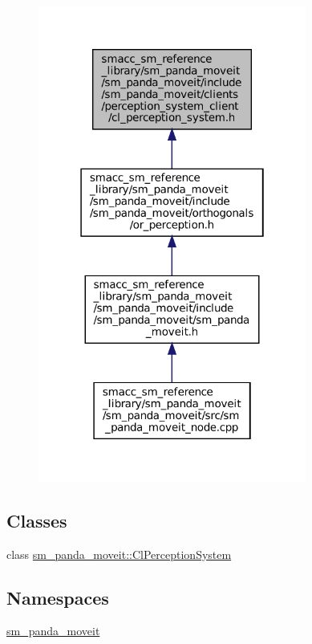 \nopagebreak
\begin{figure}[H]
\begin{center}
\leavevmode
\includegraphics[width=250pt]{sm__panda__moveit_2sm__panda__moveit_2include_2sm__panda__moveit_2clients_2perception__system__c96419e3770145dc6fb5261134c3edfb3}
\end{center}
\end{figure}
\subsection*{Classes}
\begin{DoxyCompactItemize}
\item 
class \hyperlink{classsm__panda__moveit_1_1ClPerceptionSystem}{sm\+\_\+panda\+\_\+moveit\+::\+Cl\+Perception\+System}
\end{DoxyCompactItemize}
\subsection*{Namespaces}
\begin{DoxyCompactItemize}
\item 
 \hyperlink{namespacesm__panda__moveit}{sm\+\_\+panda\+\_\+moveit}
\end{DoxyCompactItemize}
